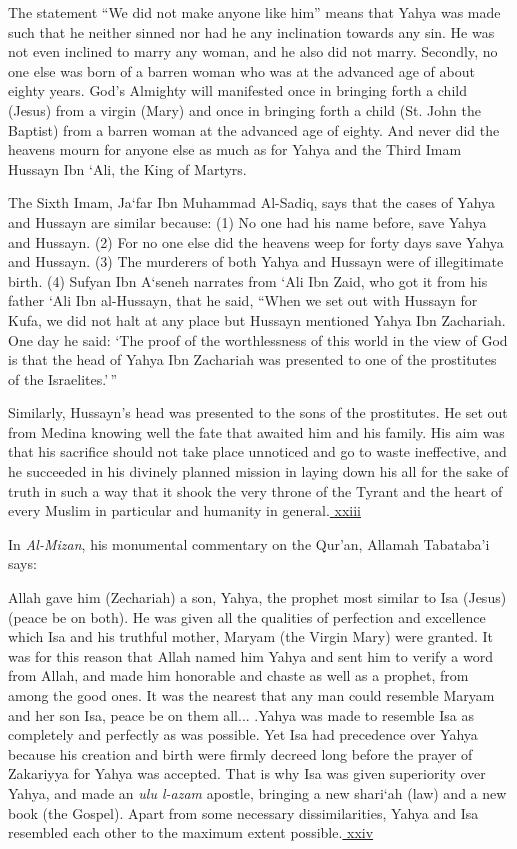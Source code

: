 \begin{quotex}
The statement ``We did not make anyone like him'' means that Yahya was made such that he neither sinned nor had he any inclination towards any sin. He was not even inclined to marry any woman, and he also did not marry. Secondly, no one else was born of a barren woman who was at the advanced age of about eighty years. God's Almighty will manifested once in bringing forth a child (Jesus) from a virgin (Mary) and once in bringing forth a child (St. John the Baptist) from a barren woman at the advanced age of eighty. And never did the heavens mourn for anyone else as much as for Yahya and the Third Imam Hussayn Ibn `Ali, the King of Martyrs.

The Sixth Imam, Ja`far Ibn Muhammad Al-Sadiq, says that the cases of Yahya and Hussayn are similar because: (1) No one had his name before, save Yahya and Hussayn. (2) For no one else did the heavens weep for forty days save Yahya and Hussayn. (3) The murderers of both Yahya and Hussayn were of illegitimate birth. (4) Sufyan Ibn A`seneh narrates from `Ali Ibn Zaid, who got it from his father `Ali Ibn al-Hussayn, that he said, ``When we set out with Hussayn for Kufa, we did not halt at any place but Hussayn mentioned Yahya Ibn Zachariah. One day he said: `The proof of the worthlessness of this world in the view of God is that the head of Yahya Ibn Zachariah was presented to one of the prostitutes of the Israelites.'\,''
\end{quotex}


Similarly, Hussayn's head was presented to the sons of the prostitutes. He set out from Medina knowing well the fate that awaited him and his family. His aim was that his sacrifice should not take place unnoticed and go to waste ineffective, and he succeeded in his divinely planned mission in laying down his all for the sake of truth in such a way that it shook the very throne of the Tyrant and the heart of every Muslim in particular and humanity in general.\hyperref[_edn23]{ xxiii }

In \emph{Al-Mizan}, his monumental commentary on the Qur'an, Allamah Tabataba'i says:

\begin{quotex}
Allah gave him (Zechariah) a son, Yahya, the prophet most similar to Isa (Jesus) (peace be on both). He was given all the qualities of perfection and excellence which Isa and his truthful mother, Maryam (the Virgin Mary) were granted. It was for this reason that Allah named him Yahya and sent him to verify a word from Allah, and made him honorable and chaste as well as a prophet, from among the good ones. It was the nearest that any man could resemble Maryam and her son Isa, peace be on them all... .Yahya was made to resemble Isa as completely and perfectly as was possible. Yet Isa had precedence over Yahya because his creation and birth were firmly decreed long before the prayer of Zakariyya for Yahya was accepted. That is why Isa was given superiority over Yahya, and made an \emph{ulu l-azam} apostle, bringing a new shari`ah (law) and a new book (the Gospel). Apart from some necessary dissimilarities, Yahya and Isa resembled each other to the maximum extent possible.\hyperref[_edn24]{ xxiv }
\end{quotex}

